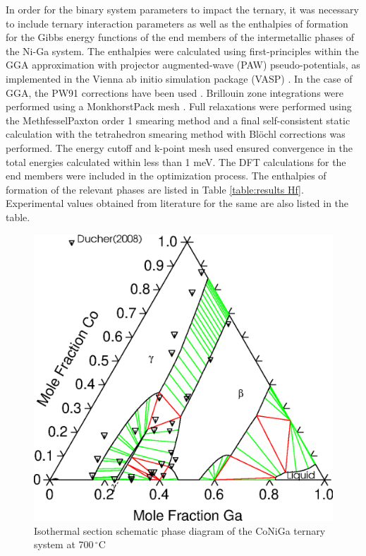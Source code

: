 \documentclass[article]{elsarticle}
\begin{document}
In order for the binary system parameters to impact the ternary, it was necessary to include
ternary interaction parameters as well as the enthalpies of formation for the Gibbs energy
functions of the end members of the
intermetallic phases of the Ni-Ga system. The enthalpies were calculated
using first-principles within the GGA approximation
with projector augmented-wave (PAW) pseudo-potentials, as implemented in the
Vienna ab initio simulation package (VASP) \cite{96Kres,96Kress}. In the case of
GGA, the PW91 corrections have been used \cite{92Perd}. Brillouin zone
integrations were performed using a Monkhorst\textendash{}Pack mesh
\cite{76Monk}. Full relaxations were performed using the
Methfessel\textendash{}Paxton order 1 smearing method \cite{89Meth} and a final
self-consistent static calculation with the tetrahedron smearing method with
Bl\"{o}chl corrections \cite{94Bloc} was performed. The energy cutoff and
k-point mesh used ensured convergence in the total energies calculated within
less than 1 meV. The DFT calculations for the end members were
included in the optimization process. The enthalpies of formation of the relevant phases are listed in Table \ref{table:results Hf}. Experimental values obtained from literature for the same are also listed in the table.
\begin{figure}[t!]
\centering
\includegraphics[scale =0.45]{973_isothermal}
\caption{Isothermal section schematic phase diagram of the CoNiGa ternary system at 700$\,^{\circ}\mathrm{C}$}
\label{973}
\end{figure}
\end{document}
